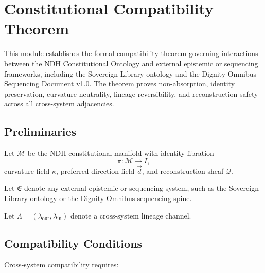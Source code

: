 
\section{Constitutional Compatibility Theorem}
\label{sec:compatibility-theorem}

This module establishes the formal compatibility theorem governing interactions
between the NDH Constitutional Ontology and external epistemic or sequencing
frameworks, including the Sovereign-Library ontology and the Dignity Omnibus
Sequencing Document v1.0. The theorem proves non-absorption, identity
preservation, curvature neutrality, lineage reversibility, and reconstruction
safety across all cross-system adjacencies.


\subsection{Preliminaries}

Let $\mathcal{M}$ be the NDH constitutional manifold with identity fibration
\[
\pi : \mathcal{M} \to I,
\]
curvature field $\kappa$, preferred direction field $\vec{d}$, and
reconstruction sheaf $\mathcal{Q}$.

Let $\mathfrak{E}$ denote any external epistemic or sequencing system, such as
the Sovereign-Library ontology or the Dignity Omnibus sequencing spine.

Let $\Lambda = (\lambda_{\mathrm{out}}, \lambda_{\mathrm{in}})$ denote a
cross-system lineage channel.


\subsection{Compatibility Conditions}

Cross-system compatibility requires:

